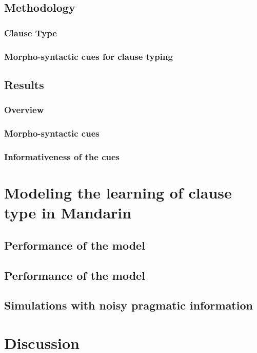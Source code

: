\subsection{Methodology}
\label{sec:mancl:corpus:method}
\subsubsection{Clause Type}
\subsubsection{Morpho-syntactic cues for clause typing}

\subsection{Results}
\label{sec:mancl:corpus:results}
\subsubsection{Overview}
\label{sec:mancl:corpus:results:mapping}


\subsubsection{Morpho-syntactic cues}
\label{sec:mancl:corpus:results:syn}

\subsubsection{Informativeness of the cues}
\label{sec:mancl:corpus:results:supervised}


\section{Modeling the learning of clause type in 
Mandarin}
\label{sec:mancl:model}


\subsection{Performance of the \dlearnerabbr{} model}
\label{sec:mancl:model:results:d}

\subsection{Performance of the \plearnerabbr{} model}
\label{sec:mancl:model:results:d}

\subsection{Simulations with noisy pragmatic information}
\label{sec:mancl:model:results:noisy}

\section{Discussion}
\label{sec:mancl:discussion}




